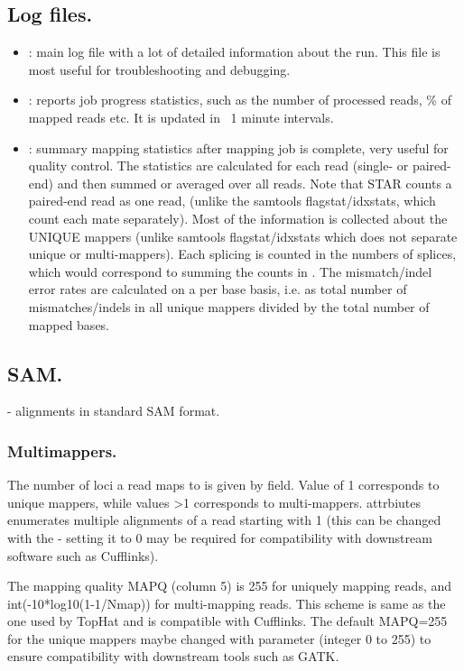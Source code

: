 \documentclass[12pt]{article}
\begin{document}
\subsection{Log files.}
\begin{itemize}
\item[]
: main log file with a lot of detailed information about the run. This file is most useful for troubleshooting and debugging.
\item[]
: reports job progress statistics, such as the number of processed reads, \% of mapped reads etc. It is updated in ~1 minute intervals.
\item[]
: summary mapping statistics after mapping job is complete, very useful for quality control. The statistics are calculated for each read (single- or paired-end) and then summed or averaged over all reads. Note that STAR counts a paired-end read as one read, (unlike the samtools flagstat/idxstats, which count each mate separately). Most of the information is collected about the UNIQUE mappers (unlike samtools flagstat/idxstats which does not separate unique or multi-mappers). Each splicing is counted in the numbers of splices, which would correspond to summing the counts in . The mismatch/indel error rates are calculated on a per base basis, i.e. as total number of mismatches/indels in all unique mappers divided by the total number of mapped bases.
\end{itemize}

\subsection{SAM.}
 - alignments in standard SAM format.
\subsubsection{Multimappers.}
The number of loci  a read maps to is given by   field. Value of 1 corresponds to unique mappers, while values \textgreater1 corresponds to multi-mappers.  attrbiutes enumerates multiple alignments of a read starting with 1 (this can be changed with the  - setting it to 0 may be required for compatibility with downstream software such as Cufflinks).

The mapping quality MAPQ (column 5) is 255 for uniquely mapping reads, and int(-10*log10(1-1/Nmap))  for multi-mapping reads. This scheme is same as the one used by TopHat and is compatible with Cufflinks. The default MAPQ=255 for the unique mappers maybe changed with   parameter (integer 0 to 255) to ensure compatibility with downstream tools such as GATK.
\end{document}
